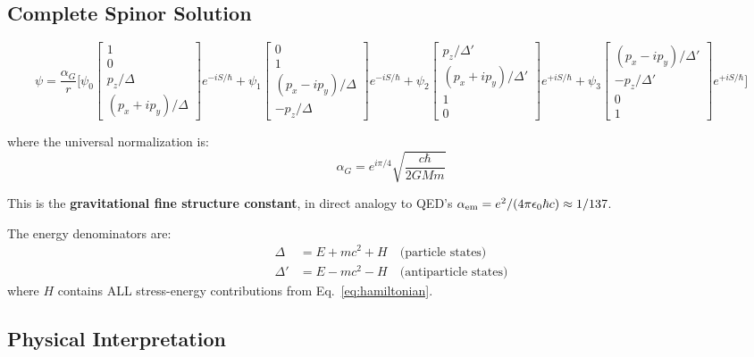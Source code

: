 \documentclass[11pt,a4paper]{article}
\theoremstyle{definition}
\theoremstyle{remark}
\begin{document}
	\subsection{Complete Spinor Solution}
	
	\begin{equation}
		\psi = \frac{\alpha_G}{r}\Bigg[
		\psi_0\begin{bmatrix}1\\0\\ p_z/\Delta\\ (p_x+ip_y)/\Delta\end{bmatrix}e^{-iS/\hbar}
		+\psi_1\begin{bmatrix}0\\1\\ (p_x-ip_y)/\Delta\\ -p_z/\Delta\end{bmatrix}e^{-iS/\hbar}
		+\psi_2\begin{bmatrix}p_z/\Delta'\\ (p_x+ip_y)/\Delta'\\1\\0\end{bmatrix}e^{+iS/\hbar}
		+\psi_3\begin{bmatrix}(p_x-ip_y)/\Delta'\\ -p_z/\Delta'\\0\\1\end{bmatrix}e^{+iS/\hbar}
		\Bigg]
		\label{eq:four_component_wavefunction}
	\end{equation}
	
	where the universal normalization is:
	\begin{equation}
		\boxed{\alpha_G = e^{i\pi/4}\sqrt{\frac{c\hbar}{2GMm}}}
		\label{eq:universal_alphaG}
	\end{equation}
	
	This is the \textbf{gravitational fine structure constant}, in direct analogy to QED's $\alpha_{\rm em}=e^2/(4\pi\epsilon_0\hbar c)\approx 1/137$.
	
	The energy denominators are:
	\begin{align}
		\Delta  &= E + mc^2 + H \quad\text{(particle states)} \\
		\Delta' &= E - mc^2 - H \quad\text{(antiparticle states)}
	\end{align}
	where $H$ contains ALL stress-energy contributions from Eq.~\eqref{eq:hamiltonian}.
	
	\subsection{Physical Interpretation}
	
\end{document}
